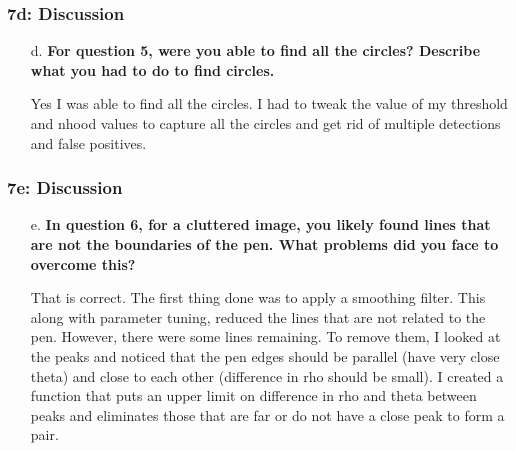     \begin{frame}[t]
		\frametitle{7d: Discussion}
		
		\begin{normalsize}
			\begin{itemize}
				\setlength\itemsep{1em}
				
				\item[d.] \textbf{For question 5, were you able to find all the circles?  Describe what you had to do to find circles.}

				\item[] Yes I was able to find all the circles. I had to tweak the value of my threshold and nhood values to capture all the circles and get rid of multiple detections and false positives.
				
			\end{itemize}
		\end{normalsize}
		
	\end{frame}
    
    \begin{frame}[t]
		\frametitle{7e: Discussion}
		
		\begin{normalsize}
			\begin{itemize}
				\setlength\itemsep{1em}
				
				\item[e.] \textbf{In question 6, for a cluttered image, you likely found lines that are not the boundaries of the pen.  What problems did you face to overcome this?}

				\item[] That is correct. The first thing done was to apply a smoothing filter. This along with parameter tuning, reduced the lines that are not related to the pen. However, there were some lines remaining. To remove them, I looked at the peaks and noticed that the pen edges should be parallel (have very close theta) and close to each other (difference in rho should be small). I created a function that puts an upper limit on difference in rho and theta between peaks and eliminates those that are far or do not have a close peak to form a pair.
				
			\end{itemize}
		\end{normalsize}
		
	\end{frame}
    

